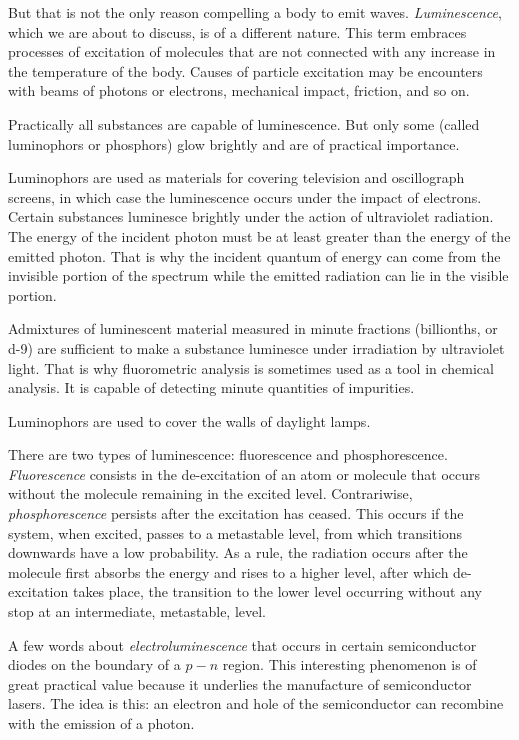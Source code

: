 But that is not the only reason compelling a body to emit waves. \emph{Luminescence}, which we are about to discuss, is of a different nature. This term embraces processes of excitation of molecules that are not connected with any increase in the temperature of the body. Causes of particle excitation may be encounters with beams of photons or electrons, mechanical impact, friction, and so on.

Practically all substances are capable of luminescence. But only some (called luminophors or phosphors) glow brightly and are of practical importance.

Luminophors are used as materials for covering television and oscillograph screens, in which case the luminescence occurs under the impact of electrons. Certain substances luminesce brightly under the action of ultraviolet radiation. The energy of the incident photon must be at least greater than the energy of the emitted photon. That is why the incident quantum of energy can come from the invisible portion of the spectrum while the emitted radiation can lie in the visible portion.

Admixtures of luminescent material measured in minute fractions (billionths, or \num{d-9}) are sufficient to make a substance luminesce under irradiation by ultraviolet light. That is why fluorometric analysis is sometimes used as a tool in chemical analysis. It is capable of detecting minute quantities of impurities.

Luminophors are used to cover the walls of daylight lamps.

There are two types of luminescence: fluorescence and phosphorescence. \emph{Fluorescence} consists in the de-excitation of an atom or molecule that occurs without the molecule remaining in the excited level. Contrariwise, \emph{phosphorescence} persists after the excitation has ceased. This occurs if the system, when excited, passes to a metastable level, from which transitions downwards have a low probability. As a rule, the radiation occurs after the molecule first absorbs the energy and rises to a higher level, after which de-excitation takes place, the transition to the lower level occurring without any stop at an intermediate, metastable, level.

A few words about \emph{electroluminescence} that occurs in certain semiconductor diodes on the boundary of a $p\!-	\!n$ region. This interesting phenomenon is of great practical value because it underlies the manufacture of semiconductor lasers. The idea is this: an electron and hole of the semiconductor can recombine with the emission of a photon.

